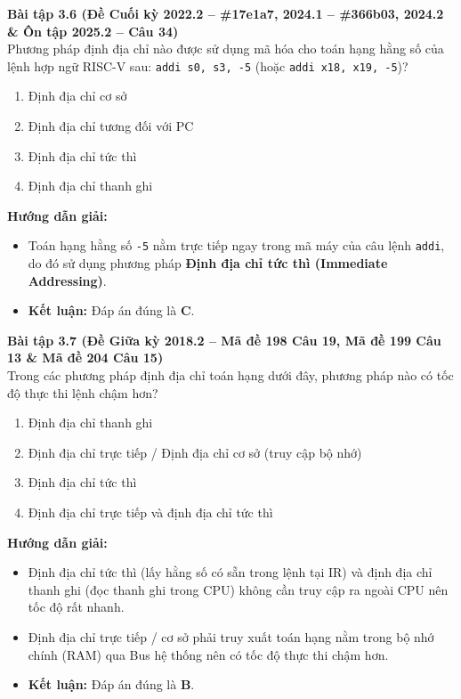 \textbf{Bài tập 3.6 (Đề Cuối kỳ 2022.2 -- \#17e1a7, 2024.1 -- \#366b03, 2024.2 \& Ôn tập 2025.2 -- Câu 34)}\\
Phương pháp định địa chỉ nào được sử dụng mã hóa cho toán hạng hằng số của lệnh hợp ngữ RISC-V sau: \texttt{addi s0, s3, -5} (hoặc \texttt{addi x18, x19, -5})?
\begin{enumerate}[label=\Alph*.]
    \item Định địa chỉ cơ sở
    \item Định địa chỉ tương đối với PC
    \item Định địa chỉ tức thì
    \item Định địa chỉ thanh ghi
\end{enumerate}
\textbf{Hướng dẫn giải:}
\begin{itemize}
    \item Toán hạng hằng số \texttt{-5} nằm trực tiếp ngay trong mã máy của câu lệnh \texttt{addi}, do đó sử dụng phương pháp \textbf{Định địa chỉ tức thì (Immediate Addressing)}.
    \item \textbf{Kết luận:} Đáp án đúng là \textbf{C}.
\end{itemize}

\textbf{Bài tập 3.7 (Đề Giữa kỳ 2018.2 -- Mã đề 198 Câu 19, Mã đề 199 Câu 13 \& Mã đề 204 Câu 15)}\\
Trong các phương pháp định địa chỉ toán hạng dưới đây, phương pháp nào có tốc độ thực thi lệnh chậm hơn?
\begin{enumerate}[label=\Alph*.]
    \item Định địa chỉ thanh ghi
    \item Định địa chỉ trực tiếp / Định địa chỉ cơ sở (truy cập bộ nhớ)
    \item Định địa chỉ tức thì
    \item Định địa chỉ trực tiếp và định địa chỉ tức thì
\end{enumerate}
\textbf{Hướng dẫn giải:}
\begin{itemize}
    \item Định địa chỉ tức thì (lấy hằng số có sẵn trong lệnh tại IR) và định địa chỉ thanh ghi (đọc thanh ghi trong CPU) không cần truy cập ra ngoài CPU nên tốc độ rất nhanh.
    \item Định địa chỉ trực tiếp / cơ sở phải truy xuất toán hạng nằm trong bộ nhớ chính (RAM) qua Bus hệ thống nên có tốc độ thực thi chậm hơn.
    \item \textbf{Kết luận:} Đáp án đúng là \textbf{B}.
\end{itemize}

